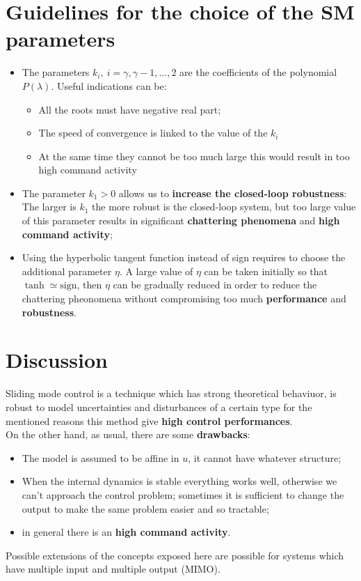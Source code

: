 \section{Guidelines for the choice of the SM parameters}
\begin{itemize}
    \item The parameters $k_i, \ i=\gamma, \gamma-1, ..., 2$ are the coefficients  of the polynomial $P(\lambda)$. Useful indications can be:
    \begin{itemize}
        \item All the roots must have negative real part;
        \item The speed of convergence is linked to the value of the $k_i$
        \item At the same time they cannot be too much large this would result in too high command activity
    \end{itemize}
    \item The parameter $k_1>0$ allows us to \textbf{increase the closed-loop robustness}: The larger is $k_1$ the more robust is the closed-loop system, but too large value of this parameter results in significant \textbf{chattering phenomena} and \textbf{high command activity};
    \item Using the hyperbolic tangent function instead of sign requires to choose the additional parameter $\eta$. A large value of $\eta$ can be taken initially so that $\tanh \simeq \text{sign}$, then $\eta$ can be gradually reduced in order to reduce the chattering pheonomena without compromising too much \textbf{performance} and \textbf{robustness}.
    
\end{itemize}

\section{Discussion}
Sliding mode control is a technique which has strong theoretical behaviuor, is robust to model uncertainties and disturbances of a certain type for the mentioned reasons this method give \textbf{high control performances}. \\
On the other hand, as usual, there are some \textbf{drawbacks}:
\begin{itemize}
    \item The model is assumed to be affine in $u$, it cannot have whatever structure; 
    \item When the internal dynamics is stable everything works well, otherwise we can't approach the control problem; sometimes it is sufficient to change the output to make the same problem easier and so tractable; 
    \item in general there is an \textbf{high command activity}.
\end{itemize}
Possible extensions of the concepts exposed here are possible for systems which have multiple input and multiple output (MIMO).
